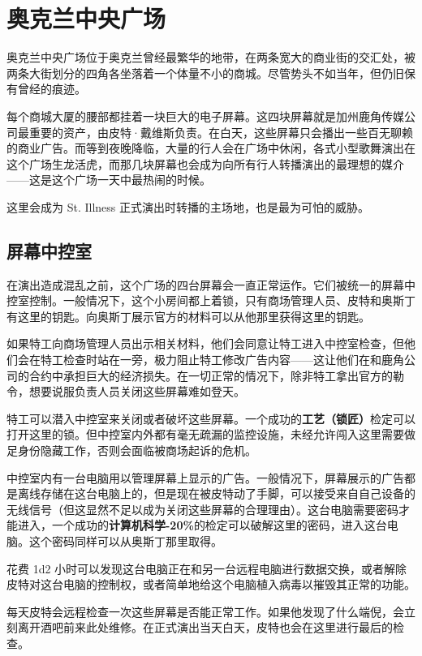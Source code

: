 \section{奥克兰中央广场}
奥克兰中央广场位于奥克兰曾经最繁华的地带，在两条宽大的商业街的交汇处，被两条大街划分的四角各坐落着一个体量不小的商城。尽管势头不如当年，但仍旧保有曾经的痕迹。

每个商城大厦的腰部都挂着一块巨大的电子屏幕。这四块屏幕就是加州鹿角传媒公司最重要的资产，由皮特·戴维斯负责。在白天，这些屏幕只会播出一些百无聊赖的商业广告。而等到夜晚降临，大量的行人会在广场中休闲，各式小型歌舞演出在这个广场生龙活虎，而那几块屏幕也会成为向所有行人转播演出的最理想的媒介——这是这个广场一天中最热闹的时候。

这里会成为 St. Illness 正式演出时转播的主场地，也是最为可怕的威胁。

\subsection{屏幕中控室}
在演出造成混乱之前，这个广场的四台屏幕会一直正常运作。它们被统一的屏幕中控室控制。一般情况下，这个小房间都上着锁，只有商场管理人员、皮特和奥斯丁有这里的钥匙。向奥斯丁展示官方的材料可以从他那里获得这里的钥匙。

如果特工向商场管理人员出示相关材料，他们会同意让特工进入中控室检查，但他们会在特工检查时站在一旁，极力阻止特工修改广告内容——这让他们在和鹿角公司的合约中承担巨大的经济损失。在一切正常的情况下，除非特工拿出官方的勒令，想要说服负责人员关闭这些屏幕难如登天。

特工可以潜入中控室来关闭或者破坏这些屏幕。一个成功的\textbf{工艺（锁匠）}检定可以打开这里的锁。但中控室内外都有毫无疏漏的监控设施，未经允许闯入这里需要做足身份隐藏工作，否则会面临被商场起诉的危机。

中控室内有一台电脑用以管理屏幕上显示的广告。一般情况下，屏幕展示的广告都是离线存储在这台电脑上的，但是现在被皮特动了手脚，可以接受来自自己设备的无线信号（但这显然不足以成为关闭这些屏幕的合理理由）。这台电脑需要密码才能进入，一个成功的\textbf{计算机科学-20\%}的检定可以破解这里的密码，进入这台电脑。这个密码同样可以从奥斯丁那里取得。

花费 1d2 小时可以发现这台电脑正在和另一台远程电脑进行数据交换，或者解除皮特对这台电脑的控制权，或者简单地给这个电脑植入病毒以摧毁其正常的功能。

每天皮特会远程检查一次这些屏幕是否能正常工作。如果他发现了什么端倪，会立刻离开酒吧前来此处维修。在正式演出当天白天，皮特也会在这里进行最后的检查。